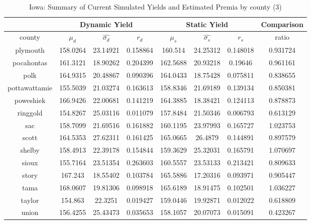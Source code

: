 \begin{table}[H]\centering
\caption{Iowa: Summary of Current Simulated Yields and Estimated Premia by county (3)}
\label{my-label}
\begin{tabular}{|c|ccc|ccc|c|}

\hline
\multicolumn{1}{|c}{} & \multicolumn{3}{|c}{Dynamic Yield} & \multicolumn{3}{|c}{Static Yield} & \multicolumn{1}{|c|}{Comparison}\\ 
\hline
county        & $\mu_d$ & $\hat{\sigma_d}$ & $r_d$ & $\mu_s$ & $\hat{\sigma_s}$ & $r_s$ & ratio \\
\hline

plymouth      & 158.0264 & 23.14921       & 0.158864 & 160.514  & 24.25312       & 0.148018 & 0.931724 \\
pocahontas    & 161.3121 & 18.90262       & 0.204399 & 162.5688 & 20.93218       & 0.19646  & 0.961161 \\
polk          & 164.9315 & 20.48867       & 0.090396 & 164.0433 & 18.75428       & 0.075811 & 0.838655 \\
pottawattamie & 155.5039 & 21.03274       & 0.163613 & 158.8346 & 21.69189       & 0.139134 & 0.850381 \\
poweshiek     & 166.9426 & 22.00681       & 0.141219 & 164.3885 & 18.38421       & 0.124113 & 0.878873 \\
ringgold      & 154.8267 & 25.03116       & 0.011079 & 157.8484 & 21.50346       & 0.006793 & 0.613129 \\
sac           & 158.7099 & 21.69516       & 0.161882 & 160.1195 & 23.97993       & 0.165727 & 1.023753 \\
scott         & 164.5353 & 27.62311       & 0.161425 & 165.0665 & 26.4879        & 0.144891 & 0.897579 \\
shelby        & 158.4913 & 22.39178       & 0.154844 & 159.3629 & 25.32031       & 0.165791 & 1.070697 \\
sioux         & 155.7164 & 23.51354       & 0.263603 & 160.5557 & 23.53133       & 0.213421 & 0.809633 \\
story         & 167.243  & 18.55402       & 0.103784 & 165.5886 & 17.20316       & 0.093971 & 0.905447 \\
tama          & 168.0607 & 19.81306       & 0.098918 & 165.6189 & 18.91475       & 0.102501 & 1.036227 \\
taylor        & 154.863  & 22.3251        & 0.019427 & 159.0446 & 19.92871       & 0.012022 & 0.618809 \\
union         & 156.4255 & 25.43473       & 0.035653 & 158.1057 & 20.07073       & 0.015091 & 0.423267 \\

\end{tabular}
\end{table}
